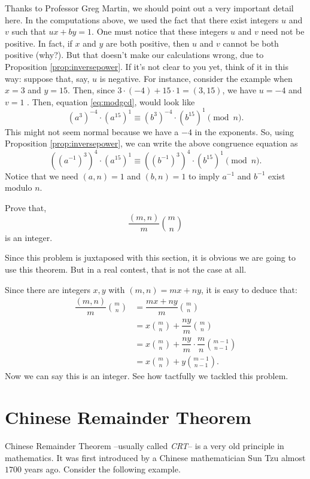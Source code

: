 \documentclass{subfile}
\begin{document}
\begin{remark}
		Thanks to Professor Greg Martin, we should point out a very important detail here. In the computations above, we used the fact that there exist integers $u$ and $v$ such that $ux+by = 1$. One must notice that these integers $u$ and $v$ need not be positive. In fact, if $x$ and $y$ are both positive, then $u$ and $v$ cannot be both positive (why?). But that doesn't make our calculations wrong, due to Proposition \ref{prop:inversepower}. If it's not clear to you yet, think of it in this way: suppose that, say, $u$ is negative. For instance, consider the example when $x=3$ and $y=15$. Then, since $3 \cdot (-4) + 15 \cdot 1 = (3,15)$, we have $u=-4$ and $v=1$ . Then, equation \eqref{eq:modgcd}, would look like $$(a^3)^{-4} \cdot (a^{15})^{1} \equiv (b^3)^{-4} \cdot (b^{15})^{1} \pmod n.$$
		This might not seem normal because we have a $-4$ in the exponents. So, using Proposition \ref{prop:inversepower}, we can write the above congruence equation as
		$$\left(\left(a^{-1}\right)^3\right)^{4} \cdot (a^{15})^{1} \equiv \left(\left(b^{-1}\right)^3\right)^{4} \cdot (b^{15})^{1} \pmod n.$$
		Notice that we need $(a,n)=1$ and $(b,n)=1$ to imply $a^{-1}$ and $b^{-1}$ exist modulo $n$.
\end{remark}
		
	\begin{problem}
		Prove that, $$\dfrac{(m,n)}{m}\binom{m}{n}$$ is an integer.
	\end{problem}
	Since this problem is juxtaposed with this section, it is obvious we are going to use this theorem. But in a real contest, that is not the case at all.
	\begin{solution}
		Since there are integers $x,y$ with $(m,n)=mx+ny$, it is easy to deduce that:
			\begin{align*}
			\dfrac{(m,n)}{m}\binom{m}{n} & = \dfrac{mx+ny}{m}\binom{m}{n}\\
			& = x\binom{m}{n}+\dfrac{ny}{m}\binom{m}{n}\\
			& = x\binom{m}{n}+\dfrac{ny}{m}\cdot\dfrac{m}{n}\binom{m-1}{n-1}\\
			& = x\binom{m}{n}+y\binom{m-1}{n-1}.
			\end{align*}
		Now we can say this is an integer. See how tactfully we tackled this problem.
	\end{solution}
	

\section{Chinese Remainder Theorem}	
	Chinese Remainder Theorem --usually called \textit{CRT}-- is a very old principle in mathematics. It was first introduced by a Chinese mathematician Sun Tzu almost $1700$ years ago. Consider the following example.
	
\end{document}
